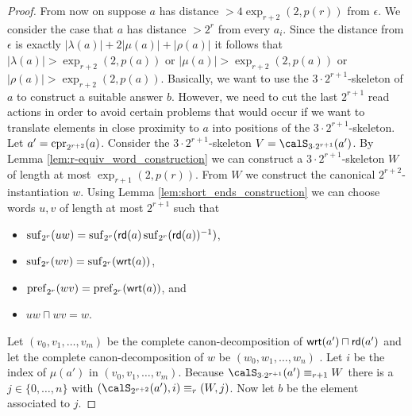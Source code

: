 \begin{proof}
	From now on suppose $a$ has  distance $> 4\exp_{r+2}(2, p(r))$ from $\epsilon$.	
	We consider the case that $a$ has distance $>2^r$ from every $a_i$.
	Since the distance from $\epsilon$ is exactly $|\lambda(a)| + 2|\mu(a)| + |\rho(a)|$ it follows that $|\lambda(a)| > \exp_{r+2}(2,p(a))$ or $|\mu({a})| > \exp_{r+2}(2,p(a))$ or $|\rho(a)| > \exp_{r+2}(2,p(a))$. 
	Basically, we want to use the $3\cdot 2^{r+1}$-skeleton of $a$ to construct a suitable answer $b$. However, we need to cut the last $2^{r+1}$ read actions in order to avoid certain problems that would occur if we want to translate elements in close proximity to $a$ into positions of the $3\cdot 2^{r+1}$-skeleton.   
	Let $a'= \operatorname{cpr}_{2^{r+2}}(a)$.  Consider 
	the $3\cdot 2^{r+1}$-skeleton $V = \calS_{3\cdot 2^{r+1}}(a')$. By Lemma \ref{lem:r-equiv_word_construction} we can construct a $3\cdot 2^{r+1}$-skeleton $W$ of length at most $\exp_{r+1}(2,p(r))$. From $W$ we construct the canonical $2^{r+2}$-instantiation $w$. Using Lemma \ref{lem:short_ends_construction} we can choose words $u,v$ of length at most 
	$2^{r+1}$ such that 
	\begin{itemize}
		\item $\operatorname{suf}_{2^{r}}(uw) = \operatorname{suf}_{2^{r}}(\mathsf{rd}(a)\operatorname{suf}_{2^{r}}(\mathsf{rd}(a))^{-1} )$,
		\item $\operatorname{suf}_{2^{r}}(wv) = \operatorname{suf}_{2^{r}}(\mathsf{wrt}(a))$,
		\item $\operatorname{pref}_{2^{r}}(wv) = \operatorname{pref}_{2^{r}}(\mathsf{wrt}(a))$, and
		\item $uw\sqcap wv = w$.
	\end{itemize}
	Let $(v_0,v_1,\ldots, v_m)$ be the complete canon-decomposition of $\mathsf{wrt}(a')\sqcap \mathsf{rd}(a')$ and let the complete canon-decomposition of $w$ be $(w_0, w_1,\ldots, w_n)$ . Let $i$
	be the index of $\mu(a')$ in $(v_0,v_1,\ldots, v_m)$. Because $\calS_{3\cdot 2^{r+1}}(a') \equiv_{r+1} W$ there is a $j\in \{0,\ldots,n\}$ with $(\calS_{2^{r+2}}(a'), i) \equiv_r (W,j)$.
	Now let $b$ be the element associated to $j$.
	

\end{proof}
